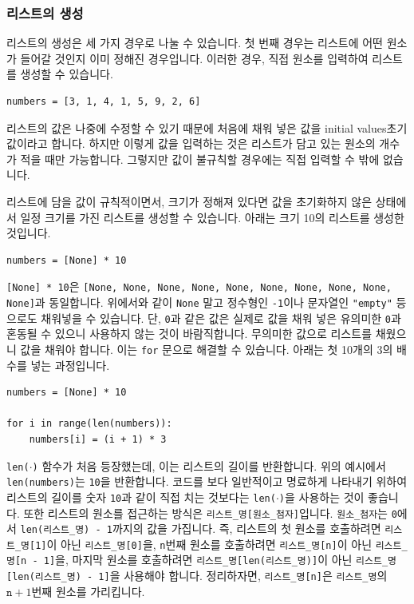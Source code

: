 \documentclass[../main.tex]{subfiles}
\begin{document}
\subsubsection{리스트의 생성}
리스트의 생성은 세 가지 경우로 나눌 수 있습니다.
첫 번째 경우는 리스트에 어떤 원소가 들어갈 것인지 이미 정해진 경우입니다.
이러한 경우, 직접 원소를 입력하여 리스트를 생성할 수 있습니다.
\begin{verbatim}
numbers = [3, 1, 4, 1, 5, 9, 2, 6]
\end{verbatim}
리스트의 값은 나중에 수정할 수 있기 때문에 처음에 채워 넣은 값을 initial values초기값이라고 합니다.
하지만 이렇게 값을 입력하는 것은 리스트가 담고 있는 원소의 개수가 적을 때만 가능합니다.
그렇지만 값이 불규칙할 경우에는 직접 입력할 수 밖에 없습니다.

리스트에 담을 값이 규칙적이면서, 크기가 정해져 있다면 값을 초기화하지 않은 상태에서 일정 크기를 가진 리스트를 생성할 수 있습니다.
아래는 크기 10의 리스트를 생성한 것입니다.
\begin{verbatim}
numbers = [None] * 10
\end{verbatim}
\texttt{[None] * 10}은 \texttt{[None, None, None, None, None, None, None, None, None, None]}과 동일합니다.
위에서와 같이 \texttt{None} 말고 정수형인 \texttt{-1}이나 문자열인 \texttt{"empty"} 등으로도 채워넣을 수 있습니다.
단, \texttt{0}과 같은 값은 실제로 값을 채워 넣은 유의미한 \texttt{0}과 혼동될 수 있으니 사용하지 않는 것이 바람직합니다.
무의미한 값으로 리스트를 채웠으니 값을 채워야 합니다.
이는 \texttt{for} 문으로 해결할 수 있습니다.
아래는 첫 10개의 3의 배수를 넣는 과정입니다.
\begin{verbatim}
numbers = [None] * 10

for i in range(len(numbers)):
    numbers[i] = (i + 1) * 3
\end{verbatim}
\texttt{len($\cdot$)} 함수가 처음 등장했는데, 이는 리스트의 길이를 반환합니다.
위의 예시에서 \texttt{len(numbers)}는 \texttt{10}을 반환합니다.
코드를 보다 일반적이고 명료하게 나타내기 위하여 리스트의 길이를 숫자 \texttt{10}과 같이 직접 치는 것보다는 \texttt{len($\cdot$)}을 사용하는 것이 좋습니다.
또한 리스트의 원소를 접근하는 방식은 \texttt{리스트\_명[원소\_첨자]}입니다.
\texttt{원소\_첨자}는 \texttt{0}에서 \texttt{len(리스트\_명) - 1}까지의 값을 가집니다.
즉, 리스트의 첫 원소를 호출하려면 \texttt{리스트\_명[1]}이 아닌 \texttt{리스트\_명[0]}을, \texttt{n}번째 원소를 호출하려면 \texttt{리스트\_명[n]}이 아닌 \texttt{리스트\_명[n - 1]}을, 마지막 원소를 호출하려면 \texttt{리스트\_명[len(리스트\_명)]}이 아닌 \texttt{리스트\_명[len(리스트\_명) - 1]}을 사용해야 합니다.
정리하자면, \texttt{리스트\_명[n]}은 \texttt{리스트\_명}의 $\texttt{n} + 1$번째 원소를 가리킵니다.
\end{document}
